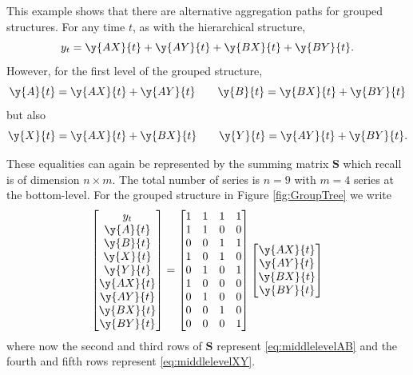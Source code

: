 \documentclass[]{book}
\begin{document}
This example shows that there are alternative aggregation paths for grouped structures. For any time \(t\), as with the hierarchical structure,
\begin{equation*}
y_{t}=\y{AX}{t}+\y{AY}{t}+\y{BX}{t}+\y{BY}{t}.
\end{equation*}
However, for the first level of the grouped structure,
\begin{equation} \y{A}{t}=\y{AX}{t}+\y{AY}{t}\quad \quad \y{B}{t}=\y{BX}{t}+\y{BY}{t}
\label{eq:middlelevelAB}
\end{equation} but also
\begin{equation} \y{X}{t}=\y{AX}{t}+\y{BX}{t}\quad \quad \y{Y}{t}=\y{AY}{t}+\y{BY}{t}
\label{eq:middlelevelXY}.
\end{equation}

These equalities can again be represented by the summing matrix \(\bm{S}\) which recall is of dimension \(n\times m\). The total number of series is \(n=9\) with \(m=4\) series at the bottom-level. For the grouped structure in Figure \ref{fig:GroupTree} we write
\[
  \begin{bmatrix}
    y_{t} \\
    \y{A}{t} \\
    \y{B}{t} \\
    \y{X}{t} \\
    \y{Y}{t} \\
    \y{AX}{t} \\
    \y{AY}{t} \\
    \y{BX}{t} \\
    \y{BY}{t}
  \end{bmatrix}
  =
  \begin{bmatrix}
    1 & 1 & 1 & 1 \\
    1 & 1 & 0 & 0 \\
    0 & 0 & 1 & 1 \\
    1 & 0 & 1 & 0 \\
    0 & 1 & 0 & 1 \\
    1 & 0 & 0 & 0 \\
    0 & 1 & 0 & 0 \\
    0 & 0 & 1 & 0 \\
    0 & 0 & 0 & 1
  \end{bmatrix}
  \begin{bmatrix}
    \y{AX}{t} \\
    \y{AY}{t} \\
    \y{BX}{t} \\
    \y{BY}{t}
  \end{bmatrix}
\]
where now the second and third rows of \(\bm{S}\) represent \eqref{eq:middlelevelAB} and the fourth and fifth rows represent \eqref{eq:middlelevelXY}.
\end{document}
